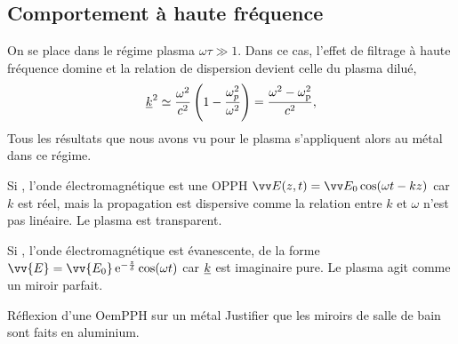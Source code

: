 \documentclass[12pt,fancy]{cours}
\begin{document}
\subsection{Comportement à haute fréquence}
On se place dans le régime plasma $\omega\tau\gg 1$. Dans ce cas, l’effet de filtrage à haute fréquence domine et la relation de dispersion devient celle du plasma dilué,
\begin{equation}
  \underline{k}^2\simeq \frac{\omega^2}{c^2}\left(1-\frac{\omega_p^2}{\omega^2}\right) 
=\frac{\omega^2-\omega_{\rm{p}}^2}{c^2},
\end{equation}
Tous les résultats que nous avons vu pour le plasma s'appliquent alors au métal dans ce régime.


\begin{liste}
  \item Si ,  l'onde électromagnétique est une OPPH $\E(z,t) = \Vec{E_0} \cos(\omega t -kz)$  car $k$ est réel, mais la propagation est dispersive comme la relation entre $k$ et $\omega$ n'est pas linéaire. Le plasma est transparent.
    \item Si , l'onde électromagnétique est évanescente, de la forme $\vv{E}=\vv{E_0}\,\e^{-\frac{z}{\delta}}\cos(\omega t)$ car $\underline{k}$ est imaginaire pure. Le plasma agit comme un miroir parfait.

\end{liste}

  


  \begin{exemple}{Réflexion d'une OemPPH sur un métal}
 Justifier que les miroirs de salle de bain sont faits en aluminium.
  \end{exemple}
\end{document}
